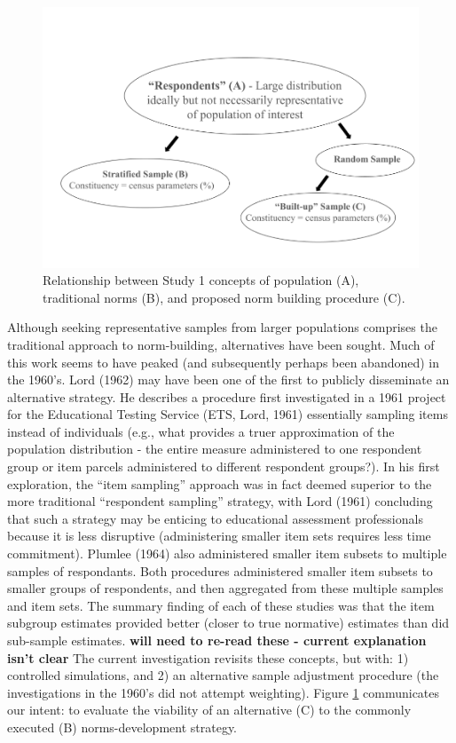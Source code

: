 \documentclass[
  ,man]{apa7}
\begin{document}
\begin{figure}
\centering
\includegraphics{NormsBuilding_files/figure-latex/schematic-1.pdf}
\caption{\label{fig:schematic}Relationship between Study 1 concepts of population (A), traditional norms (B), and proposed norm building procedure (C).}
\end{figure}

Although seeking representative samples from larger populations comprises the traditional approach to norm-building, alternatives have been sought. Much of this work seems to have peaked (and subsequently perhaps been abandoned) in the 1960's. Lord (1962) may have been one of the first to publicly disseminate an alternative strategy. He describes a procedure first investigated in a 1961 project for the Educational Testing Service (ETS, Lord, 1961) essentially sampling items instead of individuals (e.g., what provides a truer approximation of the population distribution - the entire measure administered to one respondent group or item parcels administered to different respondent groups?). In his first exploration, the ``item sampling'' approach was in fact deemed superior to the more traditional ``respondent sampling'' strategy, with Lord (1961) concluding that such a strategy may be enticing to educational assessment professionals because it is less disruptive (administering smaller item sets requires less time commitment). Plumlee (1964) also administered smaller item subsets to multiple samples of respondants. Both procedures administered smaller item subsets to smaller groups of respondents, and then aggregated from these multiple samples and item sets. The summary finding of each of these studies was that the item subgroup estimates provided better (closer to true normative) estimates than did sub-sample estimates. \textbf{will need to re-read these - current explanation isn't clear} The current investigation revisits these concepts, but with: 1) controlled simulations, and 2) an alternative sample adjustment procedure (the investigations in the 1960's did not attempt weighting). Figure \ref{fig:schematic} communicates our intent: to evaluate the viability of an alternative (C) to the commonly executed (B) norms-development strategy.
\end{document}
